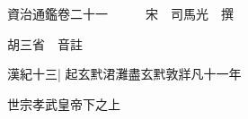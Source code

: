 






























































資治通鑑卷二十一　　　宋　司馬光　撰

胡三省　音註

漢紀十三|{
	起玄黓涒灘盡玄黓敦牂凡十一年}


世宗孝武皇帝下之上

